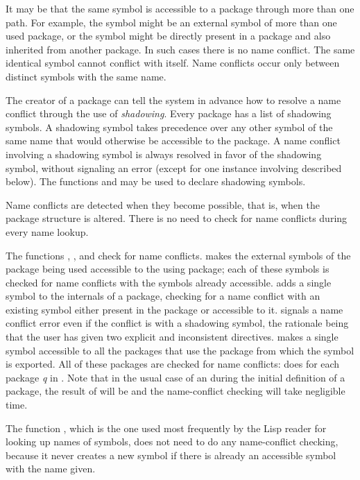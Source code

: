 It may be that the same symbol is accessible to a package through more than
one path.  For example, the symbol might be
an external symbol of more than one used package, or the symbol
might be directly present in a package and also inherited from
another package.
In such cases there is no name conflict.
The same identical symbol cannot conflict with itself.
Name conflicts occur only between distinct symbols with
the same name.

The creator of a package can tell the system in advance how to resolve a
name conflict through the use of {\it shadowing}.  Every package has a
list of shadowing symbols.  A shadowing symbol takes precedence over any
other symbol of the same name that would otherwise be accessible to the
package.  A name conflict involving a shadowing symbol is always
resolved in favor of the shadowing symbol, without signaling an error
(except for one instance involving  described below).  The
functions  and  may be used to declare
shadowing symbols.

Name conflicts are detected when they become possible, that is, when the
package structure is altered.  There is no need to check for name
conflicts during every name lookup.

The functions , , and  check for name
conflicts.   makes the external symbols of the package
being used accessible to the using package; each of these symbols is
checked for name conflicts with the symbols already accessible.
 adds a single symbol to the internals of a package, checking
for a name conflict with an existing symbol either present in the
package or accessible to it.   signals a name conflict error
even if the conflict is with a shadowing symbol, the rationale being
that the user has given two explicit and inconsistent directives.
 makes a single
symbol accessible to all the packages that use the package from which
the symbol is exported.  All of these packages are checked for
name conflicts:   does
 for each package {\it q}
in .  Note that in the usual case of
an  during the initial definition of a package, the
result of 
will be {\false} and the name-conflict checking
will take negligible time.

The function , which is the one used most
frequently by the Lisp reader for looking up names of symbols,
does not need to do any name-conflict checking, because it
never creates a new symbol if there is already an accessible symbol with
the name given.

